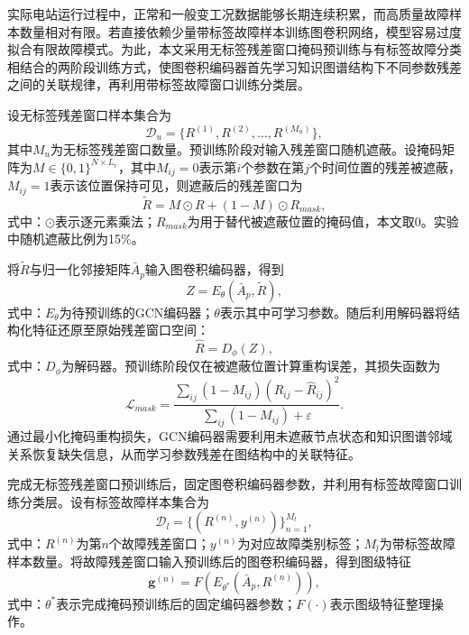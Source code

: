 实际电站运行过程中，正常和一般变工况数据能够长期连续积累，而高质量故障样本数量相对有限。若直接依赖少量带标签故障样本训练图卷积网络，模型容易过度拟合有限故障模式。为此，本文采用无标签残差窗口掩码预训练与有标签故障分类相结合的两阶段训练方式，使图卷积编码器首先学习知识图谱结构下不同参数残差之间的关联规律，再利用带标签故障窗口训练分类层。

设无标签残差窗口样本集合为
\begin{equation}
\mathcal D_u=\{R^{(1)},R^{(2)},\ldots,R^{(M_u)}\},
\end{equation}
其中$M_u$为无标签残差窗口数量。预训练阶段对输入残差窗口随机遮蔽。设掩码矩阵为$M\in\{0,1\}^{N\times L_r}$，其中$M_{ij}=0$表示第$i$个参数在第$j$个时间位置的残差被遮蔽，$M_{ij}=1$表示该位置保持可见，则遮蔽后的残差窗口为
\begin{equation}
\tilde R=M\odot R+(1-M)\odot R_{mask},
\end{equation}
式中：$\odot$表示逐元素乘法；$R_{mask}$为用于替代被遮蔽位置的掩码值，本文取0。实验中随机遮蔽比例为15\%。

将$\tilde R$与归一化邻接矩阵$\bar A_p$输入图卷积编码器，得到
\begin{equation}
Z=E_{\theta}(\bar A_p,\tilde R),
\end{equation}
式中：$E_{\theta}$为待预训练的GCN编码器；$\theta$表示其中可学习参数。随后利用解码器将结构化特征还原至原始残差窗口空间：
\begin{equation}
\hat R=D_{\phi}(Z),
\end{equation}
式中：$D_{\phi}$为解码器。预训练阶段仅在被遮蔽位置计算重构误差，其损失函数为
\begin{equation}
\mathcal L_{mask}=\frac{\sum_{ij}(1-M_{ij})(R_{ij}-\hat R_{ij})^2}{\sum_{ij}(1-M_{ij})+\varepsilon}.
\end{equation}
通过最小化掩码重构损失，GCN编码器需要利用未遮蔽节点状态和知识图谱邻域关系恢复缺失信息，从而学习参数残差在图结构中的关联特征。

完成无标签残差窗口预训练后，固定图卷积编码器参数，并利用有标签故障窗口训练分类层。设有标签故障样本集合为
\begin{equation}
\mathcal D_l=\{(R^{(n)},y^{(n)})\}_{n=1}^{M_l},
\end{equation}
式中：$R^{(n)}$为第$n$个故障残差窗口；$y^{(n)}$为对应故障类别标签；$M_l$为带标签故障样本数量。将故障残差窗口输入预训练后的图卷积编码器，得到图级特征
\begin{equation}
\mathbf g^{(n)}=F\left(E_{\theta^*}(\bar A_p,R^{(n)})\right),
\end{equation}
式中：$\theta^*$表示完成掩码预训练后的固定编码器参数；$F(\cdot)$表示图级特征整理操作。

